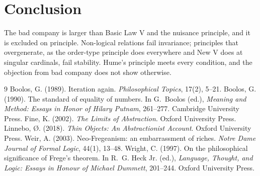 \documentclass{situationist-preprint}
\begin{document}
\section{Conclusion}

The bad company is larger than Basic Law V and the nuisance principle, and it is excluded on principle. Non-logical relations fail invariance; principles that overgenerate, as the order-type principle does everywhere and New V does at singular cardinals, fail stability. Hume's principle meets every condition, and the objection from bad company does not show otherwise.

\begin{thebibliography}{9}\small
{} Boolos, G. (1989). Iteration again. \emph{Philosophical Topics}, 17(2), 5--21.
 Boolos, G. (1990). The standard of equality of numbers. In G.~Boolos (ed.), \emph{Meaning and Method: Essays in Honor of Hilary Putnam}, 261--277. Cambridge University Press.
 Fine, K. (2002). \emph{The Limits of Abstraction}. Oxford University Press.
 Linnebo, {\O}. (2018). \emph{Thin Objects: An Abstractionist Account}. Oxford University Press.
 Weir, A. (2003). Neo-Fregeanism: an embarrassment of riches. \emph{Notre Dame Journal of Formal Logic}, 44(1), 13--48.
 Wright, C. (1997). On the philosophical significance of Frege's theorem. In R.~G. Heck Jr. (ed.), \emph{Language, Thought, and Logic: Essays in Honour of Michael Dummett}, 201--244. Oxford University Press.
\end{thebibliography}
\end{document}
